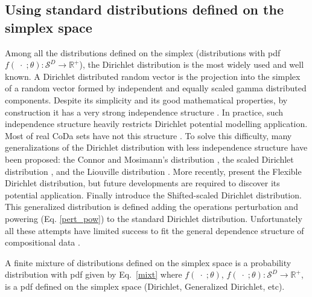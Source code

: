 \documentclass[10pt, a4paper]{article}
\begin{document}
\subsection{Using standard distributions defined on the simplex space}
\label{simplex_section}

\noindent Among all the distributions defined on the simplex (distributions with pdf $f(\;\cdot\;;\theta): \mathcal{S}^D\rightarrow \mathbb{R}^+$), the Dirichlet distribution is the most widely used and well known. 
A Dirichlet distributed random vector is the projection into the simplex of a random vector formed by independent and equally scaled gamma distributed components. 
Despite its simplicity and its good mathematical properties, by construction it has a very strong independence structure \citep{aitchison1986statistical}. 
In practice, such independence structure heavily restricts Dirichlet potential modelling application. Most of real CoDa sets have
not this structure \citep{aitchison1986statistical}. To solve this difficulty, many generalizations of the Dirichlet distribution with less
independence structure have been proposed: the Connor and Mosimann's distribution
\citep{Connor:1969}, the scaled Dirichlet distribution \citep{aitchison1986statistical},  and the Liouville distribution \citep{rayens1994dependence}.  More recently, \cite{ongaro2008new} present the Flexible Dirichlet distribution, but future
developments are required to discover its potential application. Finally \cite{monti2011shifted} introduce the Shifted-scaled Dirichlet distribution. This generalized distribution is defined adding the operations
perturbation and powering (Eq. \ref{pert_pow}) to the standard Dirichlet distribution. Unfortunately all these attempts
have limited success to fit the general dependence structure of compositional data \citep{mateu2013normal}.

A finite mixture of distributions defined on the simplex space is a probability distribution with pdf given by Eq.~\ref{mixt} where $f(\;\cdot\;;\theta)$, $f(\;\cdot\;;\theta): \mathcal{S}^D \rightarrow \mathbb{R}^+$, is a pdf defined on the simplex space (Dirichlet, Generalized Dirichlet, etc).
\end{document}
